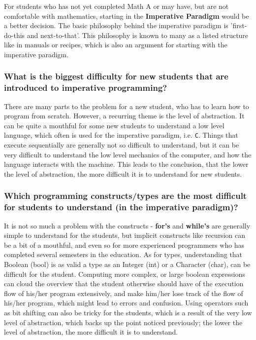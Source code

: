 For students who has not yet completed Math A or may have, but are not comfortable with mathematics, starting in the \textbf{Imperative Paradigm} would be a better decision.
The basic philosophy behind the imperative paradigm is 'first-do-this and next-to-that'.
This philosophy is known to many as a listed structure like in manuals or recipes, which is also an argument for starting with the imperative paradigm.

\subsubsection{What is the biggest difficulty for new students that are introduced to imperative programming?}

There are many parts to the problem for a new student, who has to learn how to program from scratch.
However, a recurring theme is the level of abstraction.
It can be quite a mouthful for some new students to understand a low level language, which often is used for the imperative paradigm, i.e. \texttt{C}.
Things that execute sequentially are generally not so difficult to understand, but it can be very difficult to understand the low level 
mechanics of the computer, and how the language interacts with the machine.
This leads to the conclusion, that the lower the level of abstraction, the more difficult it is to understand for new students.

\subsubsection{Which programming constructs/types are the most difficult for students to understand (in the imperative paradigm)?}

It is not so much a problem with the constructs - \textbf{for's} and \textbf{while's} are generally simple to understand for the students, but implicit constructs like recursion can be a bit of a mouthful, and even so for more experienced programmers who has completed several semesters in the education.
As for types, understanding that Boolean (bool) is as valid a type as an Integer (int) or a Character (char), can be difficult for the student.
Computing more complex, or large boolean expressions can cloud the overview that the student otherwise should have of the execution flow of his/her program extensively, and make him/her lose track of the flow of his/her program, which might lead to errors and confusion.
Using operators such as bit shifting can also be tricky for the students, which is a result of the very low level of abstraction, which backs up the point noticed previously; the lower the level of abstraction, the more difficult it is to understand.

